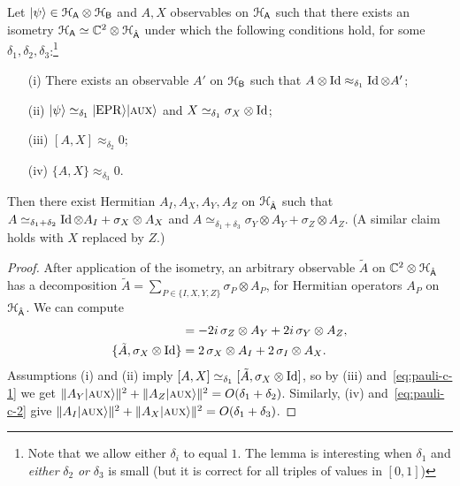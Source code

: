 \begin{lemma}\label{lem:pauli-c}
Let $|\psi\rangle \in \mathcal{H}_{{\textsf{A}}} \otimes \mathcal{H}_{{\textsf{B}}}$ and $A,X$ observables on $\mathcal{H}_{{\textsf{A}}}$ such that there exists an isometry $\mathcal{H}_{{\textsf{A}}} \simeq {\mathbb C}^2 \otimes \mathcal{H}_{\hat{{\textsf{A}}}}$ under which the following conditions hold, for some $\delta_1,\delta_2,\delta_3$:\footnote{Note that we allow either $\delta_i$ to equal $1$. The lemma is interesting when $\delta_1$ and \emph{either} $\delta_2$ \emph{or} $\delta_3$ is small (but it is correct for all triples of values in $[0,1]$)}
\begin{enumerate}
\item[(i)] There exists an observable $A'$ on $\mathcal{H}_{\textsf{B}}$ such that $A\otimes \mathop{\rm Id}\nolimits \approx_{\delta_1} \mathop{\rm Id}\nolimits \otimes A'$;
\item[(ii)] $|\psi\rangle \simeq_{\delta_1} |{\rm EPR}\rangle|\textsc {aux}\rangle$ and $X\simeq_{\delta_1} \sigma_X \otimes \mathop{\rm Id}\nolimits$; 
\item[(iii)] $[A,X]\approx_{\delta_2} 0$;
\item[(iv)] $\{A,X\} \approx_{\delta_3} 0$.
\end{enumerate}

Then there exist Hermitian $A_I,A_X,A_Y,A_Z$ on $\mathcal{H}_{\hat{{\textsf{A}}}}$ such that $A \simeq_{\delta_1+\delta_2} \mathop{\rm Id}\nolimits \otimes A_I + \sigma_X \otimes A_X$ and $A \simeq_{\delta_1 + \delta_3} \sigma_Y \otimes A_Y + \sigma_Z \otimes A_Z$. (A similar claim holds with $X$ replaced by $Z$.)
\end{lemma}

\begin{proof}
After application of the isometry, an arbitrary observable $\tilde{A}$ on  ${\mathbb C}^2 \otimes \mathcal{H}_{\hat{{\textsf{A}}}}$ has a decomposition $\tilde{A} = \sum_{P\in\{I,X,Y,Z\}} \sigma_P \otimes A_P$, for Hermitian operators $A_P$ on $\mathcal{H}_{\hat{{\textsf{A}}}}$. We can compute
\begin{align}
[\tilde{A},\sigma_X\otimes \Id] &= -2i\,\sigma_Z \otimes A_Y + 2i\,\sigma_Y \otimes A_Z,\label{eq:pauli-c-1}\\
\{\tilde{A},\sigma_X\otimes \Id\} &= 2\,\sigma_X \otimes A_I + 2 \,\sigma_I \otimes A_X.\label{eq:pauli-c-2}
\end{align} 
Assumptions (i) and (ii) imply $[A,X] \simeq_{\delta_1} [\tilde{A},\sigma_X \otimes \mathop{\rm Id}\nolimits]$, so by (iii) and~\eqref{eq:pauli-c-1} we get $\| A_Y |\textsc {aux}\rangle\|^2 + \|A_Z |\textsc {aux}\rangle\|^2 = O(\delta_1+\delta_2)$. Similarly, (iv) and~\eqref{eq:pauli-c-2} give $\| A_I |\textsc {aux}\rangle\|^2 + \|A_X |\textsc {aux}\rangle\|^2 = O(\delta_1+\delta_3)$.
\end{proof}


